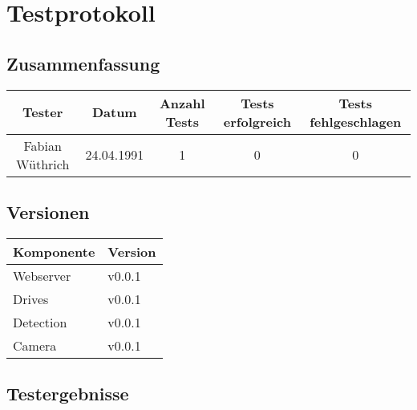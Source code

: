 \section{Testprotokoll}

\subsection{Zusammenfassung}

\begin{table}[h!]
	\centering
	\renewcommand{\arraystretch}{1.5}
	\begin{tabular}{|c|c|c|c|c|}
		\hline \textbf{Tester} & \textbf{Datum} & \textbf{Anzahl Tests} & \textbf{Tests erfolgreich} & \textbf{Tests fehlgeschlagen} \\
		\hline Fabian Wüthrich & 24.04.1991 & 1 & 0 & 0 \\ 
		\hline 
	\end{tabular}
\end{table}

\subsection{Versionen}

\begin{table}[h!]
	\centering
	\renewcommand{\arraystretch}{1.5}
	\begin{tabular}{|l|l|}
		\hline \textbf{Komponente} & \textbf{Version} \\
		\hline Webserver & v0.0.1 \\
		\hline Drives & v0.0.1 \\
		\hline Detection & v0.0.1 \\
		\hline Camera & v0.0.1 \\
		\hline 
	\end{tabular}
\end{table}

\newpage
\subsection{Testergebnisse}

